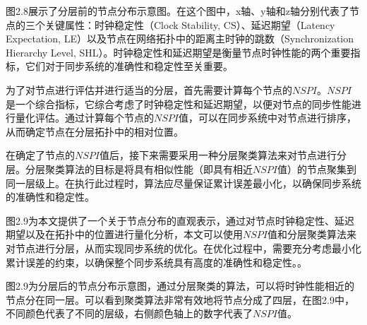 \documentclass[UTF8,a4paper,12pt]{ctexart}
\numberwithin{equation}{section}
\begin{document}
图2.8展示了分层前的节点分布示意图。在这个图中，x轴、y轴和z轴分别代表了节点的三个关键属性：时钟稳定性（Clock Stability, CS）、延迟期望（Latency Expectation, LE）以及节点在网络拓扑中的距离主时钟的跳数（Synchronization Hierarchy Level, SHL）。时钟稳定性和延迟期望是衡量节点时钟性能的两个重要指标，它们对于同步系统的准确性和稳定性至关重要。

为了对节点进行评估并进行适当的分层，首先需要计算每个节点的$NSPI$。$NSPI$是一个综合指标，它综合考虑了时钟稳定性和延迟期望，以便对节点的同步性能进行量化评估。通过计算每个节点的$NSPI$值，可以在同步系统中对节点进行排序，从而确定节点在分层拓扑中的相对位置。

在确定了节点的$NSPI$值后，接下来需要采用一种分层聚类算法来对节点进行分层。分层聚类算法的目标是将具有相似性能（即具有相近$NSPI$值）的节点聚集到同一层级上。在执行此过程时，算法应尽量保证累计误差最小化，以确保同步系统的准确性和稳定性。

图2.9为本文提供了一个关于节点分布的直观表示，通过对节点时钟稳定性、延迟期望以及在拓扑中的位置进行量化分析，本文可以使用$NSPI$值和分层聚类算法来对节点进行分层，从而实现同步系统的优化。在优化过程中，需要充分考虑最小化累计误差的约束，以确保整个同步系统具有高度的准确性和稳定性。。
\begin{figure}[H] 
\end{figure}

图2.9为分层后的节点分布示意图，通过分层聚类的算法，可以将时钟性能相近的节点分在同一层。可以看到聚类算法非常有效地将节点分成了四层，在图2.9中，不同颜色代表了不同的层级，右侧颜色轴上的数字代表了$NSPI$值。
\end{document}
